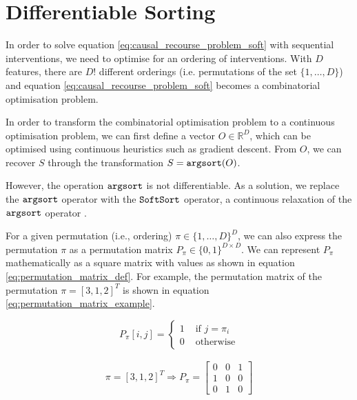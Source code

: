 \section{Differentiable Sorting}

In order to solve equation \ref{eq:causal_recourse_problem_soft} with sequential interventions, we need to optimise for an ordering of interventions. With $D$ features, there are $D!$ different orderings (i.e. permutations of the set $\{1, \ldots, D\}$) and equation \ref{eq:causal_recourse_problem_soft} becomes a combinatorial optimisation problem.

In order to transform the combinatorial optimisation problem to a continuous optimisation problem, we can first define a vector $O\in \mathbb{R}^{D}$, which can be optimised using continuous heuristics such as gradient descent. From $O$, we can recover $S$ through the transformation $S = \operatorname*{\texttt{argsort}}(O)$.

However, the operation $\operatorname*{\texttt{argsort}}$ is not differentiable. As a solution, we replace the $\operatorname*{\texttt{argsort}}$ operator with the $\operatorname*{\texttt{SoftSort}}$ operator, a continuous relaxation of the $\operatorname*{\texttt{argsort}}$ operator \citep{prilloSoftSortContinuousRelaxation2020}.

For a given permutation (i.e., ordering) $\pi \in \{1, \ldots, D\}^D$, we can also express the permutation $\pi$ as a permutation matrix $P_{\pi} \in \{0,1\}^{D \times D}$. We can represent $P_{\pi}$ mathematically as a square matrix with values as shown in equation \ref{eq:permutation_matrix_def}. For example, the permutation matrix of the permutation $\pi = [3, 1, 2]^T$ is shown in equation \ref{eq:permutation_matrix_example}. 

\begin{equation} \label{eq:permutation_matrix_def}
	P_{\pi}[i,j] = \begin{cases}
		1 & \text{ if } j = \pi_i \\
		0 & \text{ otherwise}
	\end{cases}
\end{equation}

\begin{align} \label{eq:permutation_matrix_example}
	\pi = [3, 1, 2]^T \Longrightarrow	P_{\pi} = 
	\left[\begin{array}{lllll}
		0 & 0 & 1 \\
		1 & 0 & 0 \\
		0 & 1 & 0
	\end{array}\right]
\end{align}

